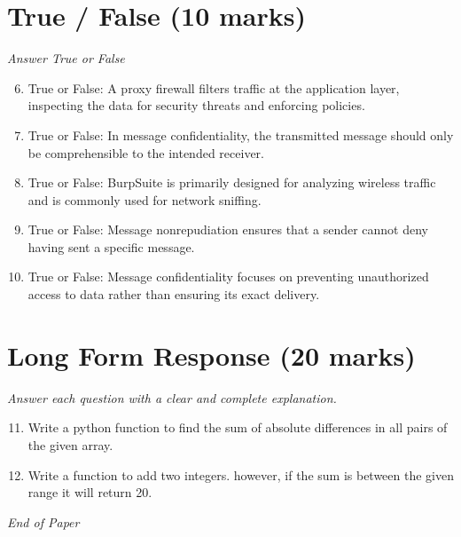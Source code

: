 \documentclass[12pt]{article}
\begin{document}
\section*{True / False (10 marks)}
\textit{Answer True or False}
\begin{enumerate}[label=\arabic*.]
\setcounter{enumi}{5}
\item True or False: A proxy firewall filters traffic at the application layer, inspecting the data for security threats and enforcing policies.
\item True or False: In message confidentiality, the transmitted message should only be comprehensible to the intended receiver.
\item True or False: BurpSuite is primarily designed for analyzing wireless traffic and is commonly used for network sniffing.
\item True or False: Message nonrepudiation ensures that a sender cannot deny having sent a specific message.
\item True or False: Message confidentiality focuses on preventing unauthorized access to data rather than ensuring its exact delivery.
\end{enumerate}

\section*{Long Form Response (20 marks)}
\textit{Answer each question with a clear and complete explanation.}
\begin{enumerate}[label=\arabic*.]
\setcounter{enumi}{10}
\item Write a python function to find the sum of absolute differences in all pairs of the given array.
\item Write a function to add two integers. however, if the sum is between the given range it will return 20.
\end{enumerate}

\vfill
\noindent\textit{End of Paper}
\end{document}
